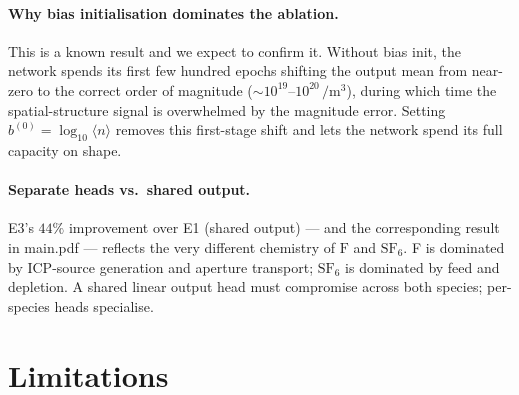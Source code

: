 \paragraph{Why bias initialisation dominates the ablation.}
This is a known result and we expect to confirm it. Without bias init, the
network spends its first few hundred epochs shifting the output mean from
near-zero to the correct order of magnitude
($\sim$$10^{19}$--$10^{20}\,\si{\per\meter\cubed}$), during which time the
spatial-structure signal is overwhelmed by the magnitude error. Setting
$b^{(0)} = \log_{10} \langle n \rangle$ removes this first-stage shift and
lets the network spend its full capacity on shape.

\paragraph{Separate heads vs.\ shared output.}
E3's $44\%$ improvement over E1 (shared output) — and the corresponding
result in main.pdf — reflects the very different chemistry of $\mathrm{F}$
and $\mathrm{SF}_6$. F is dominated by ICP-source generation and aperture
transport; $\mathrm{SF}_6$ is dominated by feed and depletion. A shared
linear output head must compromise across both species; per-species heads
specialise.

\section{Limitations}
\label{sec:ml-limitations}

